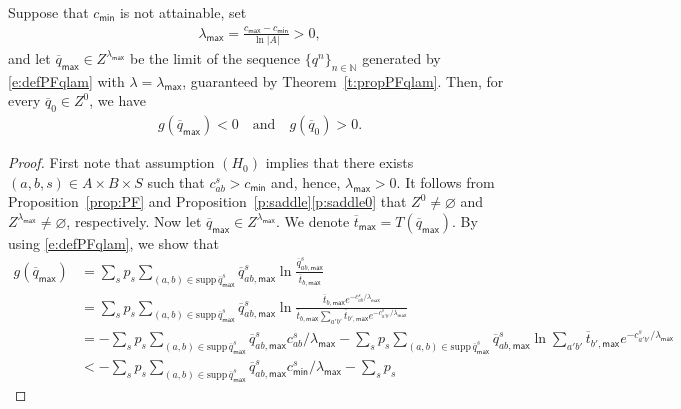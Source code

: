 \documentclass[smallextended,referee,envcountsect,]{svjour3}
\newcommand{\NN}{{\mathbb N}}
\newcommand{\supp}{\mathrm{supp}\,}
\begin{document}
\begin{lemma}\label{lemma:LambdaMax}
Suppose that $c_{\mathsf{min}}$ is not attainable, set
\begin{align}
\lambda_{\mathsf{max}} = \frac{c_{\mathsf{max}} - 
c_{\mathsf{min}}}{\ln |A|}>0,
\end{align} 
and let $\overline{q}_{\mathsf{max}}\in 
Z^{\lambda_{\mathsf{max}}}$ be the limit of the sequence 
$\{q^n\}_{n\in\NN}$ generated by \eqref{e:defPFqlam} with 
$\lambda=\lambda_{\mathsf{max}}$, 
guaranteed by Theorem~\ref{t:propPFqlam}.
Then{,} for every $\overline{q}_{0}\in Z^{0}$, we have
\begin{align}
g(\overline{q}_{\mathsf{max}})<0\quad \text{and}\quad 
g(\overline{q}_{0})>0.
\end{align}
\end{lemma}
\begin{proof}
First note that assumption $(H_0)$ implies that there 
exists $(a,b,s)\in 
A\times B\times S$ such that $c_{ab}^s>c_{\mathsf{min}}$ and, 
hence, $\lambda_{\mathsf{max}} > 0$.
It follows from Proposition~\ref{prop:PF} and 
{Proposition~\ref{p:saddle}\eqref{p:saddle0}} that 
$Z^0\neq \varnothing$ and $Z^{\lambda_{\mathsf{max}}}\neq 
\varnothing$, respectively. 
  Now let 
$\overline{q}_{\mathsf{max}}\in Z^{\lambda_{\mathsf{max}}}$.
We denote 
$\overline{t}_{\mathsf{max}} = T(\overline{q}_{\mathsf{max}})$. By 
using \eqref{e:defPFqlam}, we show that
\begin{align*}
g(\overline{q}_{\mathsf{max}})  
&= \sum_s p_s \sum_{(a,b)\in \supp 
\overline{q}_{\mathsf{max}}^s}\overline{q}_{ab,\mathsf{max}}^s  \ln 
\frac{\overline{q}_{ab,\mathsf{max}}^s}{\overline{t}_{b,\mathsf{max}}}\\
&= \sum_s p_s \sum_{(a,b)\in \supp 
\overline{q}_{\mathsf{max}}^s}\overline{q}_{ab,\mathsf{max}}^s \ln 
\frac{\overline{t}_{b,\mathsf{max}} 
e^{-c_{ab}^s/{\lambda_{\mathsf{max}}} 
}}{\overline{t}_{b,\mathsf{max}}\sum_{a'b'}\overline{t}_{b',\mathsf{max}} e^{- c_{a'b'}^s/{\lambda_{\mathsf{max}}} } } \label{}\\
&=- \sum_s p_s \sum_{(a,b)\in \supp 
\overline{q}_{\mathsf{max}}^s}\overline{q}_{ab,\mathsf{max}}^s  
c_{ab}^s/{\lambda_{\mathsf{max}}}   -  \sum_s p_s \sum_{(a,b)\in 
\supp \overline{q}_{\mathsf{max}}^s}\overline{q}_{ab,\mathsf{max}}^s 
\ln  \sum_{a'b'}\overline{t}_{b',\mathsf{max}} e^{- 
c_{a'b'}^s/{\lambda_{\mathsf{max}}} } \\
&<- \sum_s p_s \sum_{(a,b)\in \supp 
\overline{q}_{\mathsf{max}}^s}\overline{q}_{ab,\mathsf{max}}^s  
c^s_{\mathsf{min}}/{\lambda_{\mathsf{max}}}   -  \sum_s p_s 

\end{align*}
\end{proof}
\end{document}
